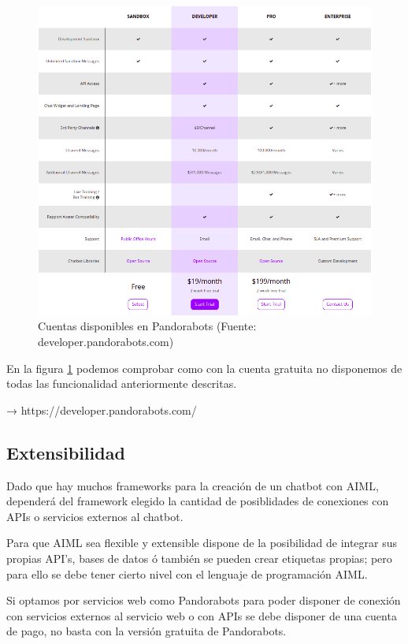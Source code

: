 \begin{figure}[h]
    \centering
    \includegraphics[width=1.0\textwidth]{imagenes/plataformas/cuentas_pandorabots.png}
    \caption{Cuentas disponibles en Pandorabots (Fuente: developer.pandorabots.com)}
    \label{fig:cuenta_pandorabots}
\end{figure}

En la figura \ref{fig:cuenta_pandorabots} podemos comprobar como con la cuenta gratuita no disponemos de todas las funcionalidad anteriormente descritas.


→ https://developer.pandorabots.com/


\subsection*{Extensibilidad}

Dado que hay muchos frameworks para la creación de un chatbot con AIML, dependerá del framework elegido la cantidad de posiblidades de conexiones con APIs o servicios externos al chatbot. 

Para que AIML sea flexible y extensible dispone de la posibilidad de integrar sus propias API's, bases de datos ó también se pueden crear etiquetas propias; pero para ello se debe tener cierto nivel con el lenguaje de programación AIML.

Si optamos por servicios web como Pandorabots para poder disponer de conexión con servicios externos al servicio web o con APIs se debe disponer de una cuenta de pago, no basta con la versión gratuita de Pandorabots.

